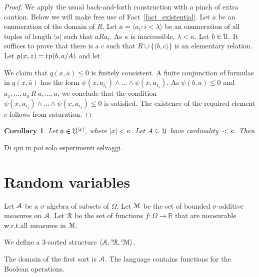 \documentclass[12pt,letterpaper,oneside,reqno]{amsart}
\theoremstyle{plain}
\newtheorem{corollary}[theorem]{Corollary}
\theoremstyle{remark}
\begin{document}
\begin{proof}
  We apply the usual back-and-forth construction with a pinch of extra caution.
  Below we will make free use of Fact~\ref{fact_existential}.
  Let $a$ be an enumeration of the domain of $R$.
  Let $\bar a=\langle a_i:i<\lambda\rangle$ be an enumeration of all tuples of length $|a|$ such that $aRa_i$.
  As $\kappa$ is inaccessible, $\lambda<\kappa$.
  Let $b\in{\EuScript U}$.
  It suffices to prove that there is a $c$ such that $R\cup\{\langle b,c\rangle\}$ is an elementary relation.
  Let $p(x,z)={\rm tp}(b,a/A)$ and let
  

  We claim that $q(x,\bar a)\le0$ is finitely consistent.
  A finite conjunction of formulas in $q(x,\bar a)$ has the form $\psi(x,a_{i_1})\wedge\dots\wedge\psi(x,a_{i_1})$.
  As $\psi(b,a)\le0$ and $a_1,\dots,a_n\,R\;a,\dots,a$, we conclude that the condition $\psi(x,a_{i_1})\wedge\dots\wedge\psi(x,a_{i_1})\le0$ is satisfied.
  The existence of the required element $c$ follows from saturation.
\end{proof}

\begin{corollary}
  Let $a\in{\EuScript U}^{|x|}$, where $|x|<\kappa$.
  Let $A\subseteq{\EuScript U}$ have cardinality $<\kappa$.
  Then

\end{corollary}


\hrulefill

Di qui in poi solo esperimenti selvaggi.


\section{Random variables}

Let ${\EuScript A}$ be a $\sigma$-algebra of subsets of $\Omega$.
Let ${\EuScript M}$ be the set of bounded $\sigma$-additive measures on ${\EuScript A}$.
Let ${\EuScript R}$ be the set of functions $f:\Omega\to{\mathds R}$ that are measurable w.r.t.\@ all measures in ${\EuScript M}$.

We define a $3$-sorted structure $\langle{\EuScript A},{}^{\circ\!}{\EuScript R},{}^{\circ\!}{\EuScript M}\rangle$.

The domain of the first sort is ${\EuScript A}$.
The language contains functions for the Boolean operations.
\end{document}
